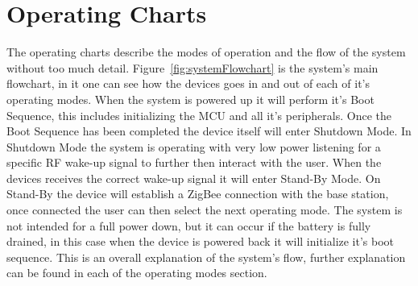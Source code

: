 \section{Operating Charts}
The operating charts describe the modes of operation and the flow of the system without too much detail. Figure~\ref{fig:systemFlowchart} is the system's main flowchart, in it one can see how the devices goes in and out of each of it's operating modes. When the system is powered up it will perform it's Boot Sequence, this includes initializing the MCU and all it's peripherals. Once the Boot Sequence has been completed the device itself will enter Shutdown Mode. In Shutdown Mode the system is operating with very low power listening for a specific RF wake-up signal to further then interact with the user. When the devices receives the correct wake-up signal it will enter Stand-By Mode. On Stand-By the device will establish a ZigBee connection with the base station, once connected the user can then select the next operating mode. The system is not intended for a full power down, but it can occur if the battery is fully drained, in this case when the device is powered back it will initialize it's boot sequence. This is an overall explanation of the system's flow, further explanation can be found in each of the operating modes section.
